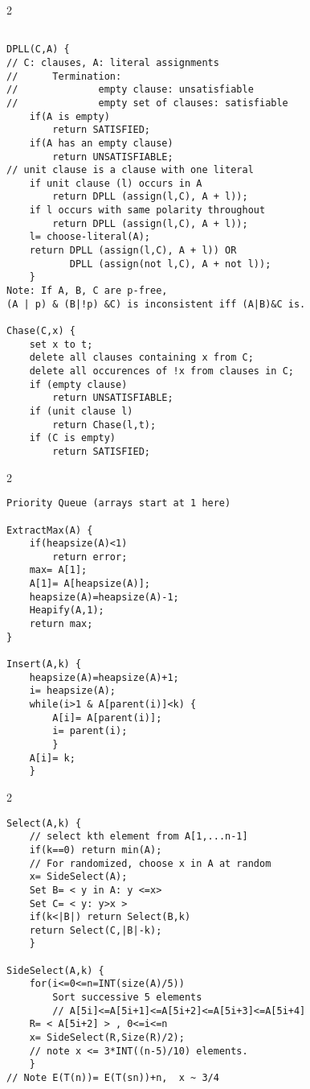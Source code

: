 \begin{multicols} {2} {
\begin{verbatim}

DPLL(C,A) {     
// C: clauses, A: literal assignments
//      Termination:
//              empty clause: unsatisfiable
//              empty set of clauses: satisfiable
    if(A is empty) 
        return SATISFIED;
    if(A has an empty clause) 
        return UNSATISFIABLE;
// unit clause is a clause with one literal
    if unit clause (l) occurs in A  
        return DPLL (assign(l,C), A + l));
    if l occurs with same polarity throughout
        return DPLL (assign(l,C), A + l));
    l= choose-literal(A);
    return DPLL (assign(l,C), A + l)) OR 
           DPLL (assign(not l,C), A + not l));
    }
Note: If A, B, C are p-free, 
(A | p) & (B|!p) &C) is inconsistent iff (A|B)&C is.

Chase(C,x) {
    set x to t;
    delete all clauses containing x from C;
    delete all occurences of !x from clauses in C;
    if (empty clause) 
        return UNSATISFIABLE;
    if (unit clause l) 
        return Chase(l,t);
    if (C is empty)  
        return SATISFIED;
\end{verbatim}
}
\end{multicols}
\begin{multicols} {2} {
\begin{verbatim}
Priority Queue (arrays start at 1 here)

ExtractMax(A) {
    if(heapsize(A)<1) 
        return error;
    max= A[1];
    A[1]= A[heapsize(A)];
    heapsize(A)=heapsize(A)-1;
    Heapify(A,1);
    return max;
}

Insert(A,k) {
    heapsize(A)=heapsize(A)+1;
    i= heapsize(A);
    while(i>1 & A[parent(i)]<k) {
        A[i]= A[parent(i)];
        i= parent(i);
        }
    A[i]= k;
    }
\end{verbatim}
}
\end{multicols}
\begin{multicols} {2} {
\begin{verbatim}
Select(A,k) {      
    // select kth element from A[1,...n-1]
    if(k==0) return min(A);
    // For randomized, choose x in A at random
    x= SideSelect(A);
    Set B= < y in A: y <=x>
    Set C= < y: y>x >
    if(k<|B|) return Select(B,k)
    return Select(C,|B|-k);
    }

SideSelect(A,k) {
    for(i<=0<=n=INT(size(A)/5))
        Sort successive 5 elements 
        // A[5i]<=A[5i+1]<=A[5i+2]<=A[5i+3]<=A[5i+4] 
    R= < A[5i+2] > , 0<=i<=n
    x= SideSelect(R,Size(R)/2);       
    // note x <= 3*INT((n-5)/10) elements.
    }
// Note E(T(n))= E(T(sn))+n,  x ~ 3/4
\end{verbatim}
}
\end{multicols}
